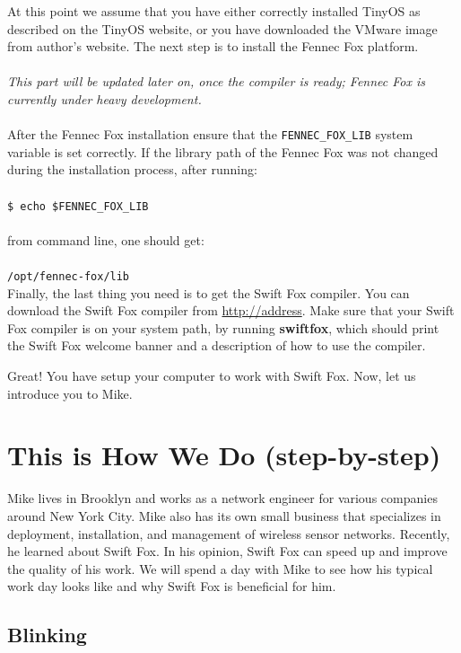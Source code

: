 \documentclass[11pt]{article}
\begin{document}
At this point we assume that you have either correctly installed TinyOS as
described on the TinyOS website, or you have downloaded the VMware image
from author's website. The next step is to install the Fennec Fox platform.
\\
\\
\textit{This part will be updated later on, once the compiler is ready;
Fennec Fox is currently under heavy development.}			\\
\\
After the Fennec Fox installation ensure that the
\texttt{FENNEC\_FOX\_LIB} system variable is set correctly. If the
library path of the Fennec Fox was not changed during the installation
process, after running:	\\
\\
\texttt{\$ echo \$FENNEC\_FOX\_LIB}					\\
\\
from command line, one should get:					\\
\\
\texttt{/opt/fennec-fox/lib}						\\

Finally, the last thing you need is to get the Swift Fox compiler. You can
download the Swift Fox compiler from \url{http://address}. Make sure that
your Swift Fox compiler is on your system path, by running
\textbf{swiftfox}, which should print the Swift Fox welcome banner and a
description of how to use the compiler.

Great! You have setup your computer to work with Swift Fox. Now, let us
introduce you to Mike.


\section{This is How We Do (step-by-step)}

Mike lives in Brooklyn and works as a network engineer for various
companies around New York City. Mike also has its own small business that
specializes in deployment, installation, and management of wireless sensor 
networks. Recently, he learned about Swift Fox. In his opinion, Swift Fox
can speed up and improve the quality of his work. We will spend a day with 
Mike to see how his typical work day looks like and why Swift Fox is
beneficial for him.

\subsection{Blinking}
\end{document}
